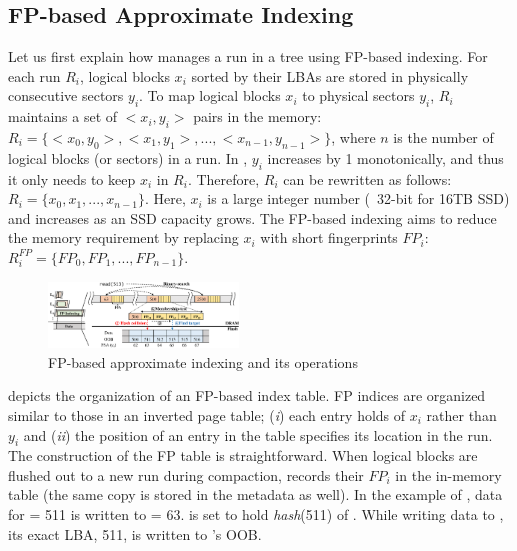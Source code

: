 \subsection{FP-based Approximate Indexing}
\label{sec:design:fp}


Let us first explain how \ours{} manages a run in a tree using FP-based
indexing.  For each run $R_i$, logical blocks $x_i$ sorted by their LBAs are stored in
physically consecutive sectors $y_i$.  To map logical blocks $x_i$ to physical
sectors $y_i$, $R_i$ maintains a set of $<x_i,y_i>$ pairs in the memory: $R_i =
\{<x_0,y_0>,<x_{1},y_{1}>, ..., <x_{n-1},y_{n-1}>\}$, where $n$ is the number
of logical blocks (or sectors) in a run.  In \ours{}, $y_i$ increases by 1
monotonically, and thus it only needs to keep $x_i$ in $R_i$. Therefore,
$R_i$ can be rewritten as follows: $R_i = \{x_0,x_{1}, ..., x_{n-1}\}$.
Here, $x_i$ is a large integer number (\eg~32-bit for 16TB SSD) and 
increases as an SSD capacity grows. The FP-based indexing aims to reduce
the memory requirement by replacing $x_i$ with short fingerprints $FP_i$:
$R_i^{FP} = \{FP_0,FP_{1}, ..., FP_{n-1}\}$.

\begin{figure}[t]
\centering
\includegraphics[width=0.45\textwidth]{figs/OSDI/FP.eps}
\caption{FP-based approximate indexing and its operations}

\label{fig:overall:fp}
\end{figure}


 depicts the organization of an FP-based index table.
FP indices are organized similar to those in an
inverted page table; (\textit{i}) each entry holds  of $x_i$ rather
than $y_i$ and (\textit{ii}) the position of an entry in the table specifies
its location in the run. The construction of the FP table is straightforward.
When logical blocks are flushed out to a new run during compaction, 
\ours{} records their $FP_{i}$ in the in-memory table (the same copy is stored in
the metadata as well).
In the example of , data for  = 511 is written to
 = 63.   is set to hold \textit{hash}(511) of .  While
writing data to , its exact LBA, 511, is written to 's OOB.

